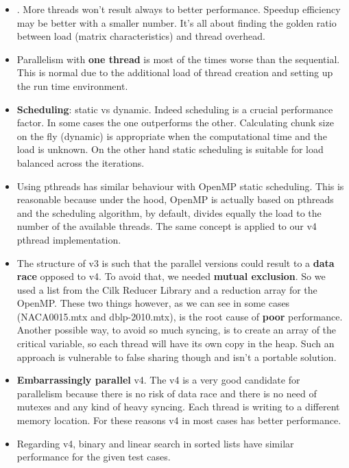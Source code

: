 \documentclass[12pt, a4paper]{article}
\begin{document}
\begin{itemize}
    \item {}. More threads won't result always to better performance. Speedup efficiency may be better with a smaller number. It's all about finding the golden ratio between load (matrix characteristics) and thread overhead.
    \item Parallelism with \textbf{one thread} is most of the times worse than the sequential. This is normal due to the additional load of thread creation and setting up the run time environment.
    \item \textbf{Scheduling}: static vs dynamic. Indeed scheduling is a crucial performance factor. In some cases the one outperforms the other. Calculating chunk size on the fly (dynamic) is appropriate when the computational time and the load is unknown. On the other hand static scheduling is suitable for load balanced across the iterations.
    \item Using pthreads has similar behaviour with OpenMP static scheduling. This is reasonable because under the hood, OpenMP is actually based on pthreads and the scheduling algorithm, by default, divides equally the load to the number of the available threads. The same concept is applied to our v4 pthread implementation.
    \item The structure of v3 is such that the parallel versions could result to a \textbf{data race} opposed to v4. To avoid that, we needed \textbf{mutual exclusion}. So we used a list from the Cilk Reducer Library and a reduction array for the OpenMP. These two things however, as we can see in some cases (NACA0015.mtx and dblp-2010.mtx), is the root cause of \textbf{poor} performance. Another possible way, to avoid so much syncing, is to create an array of the critical variable, so each thread will have its own copy in the heap. Such an approach is vulnerable to false sharing though and isn't a portable solution.
    \item \textbf{Embarrassingly parallel} v4. The v4 is a very good candidate for parallelism because there is no risk of data race and there is no need of mutexes and any kind of heavy syncing. Each thread is writing to a different memory location. For these reasons v4 in most cases has better performance.
    \item Regarding v4, binary and linear search in sorted lists have similar performance for the given test cases.
\end{itemize}
\end{document}
